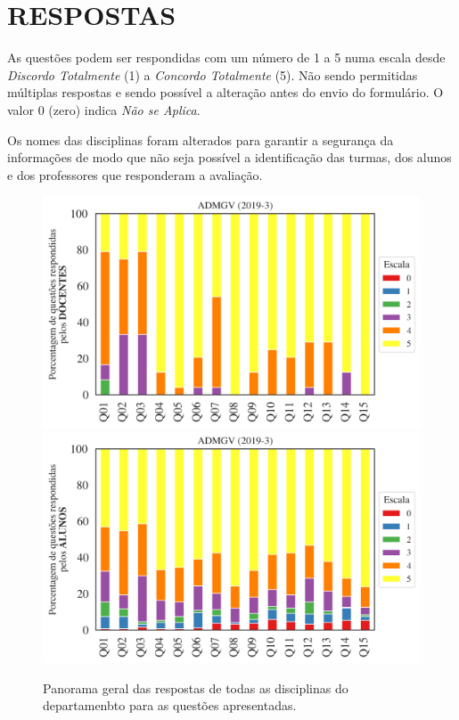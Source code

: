 \documentclass[a4paper,10pt]{article}
\begin{document}
\section{RESPOSTAS}
As questões podem ser respondidas com um número de 1 a 5 numa escala desde {\it Discordo Totalmente} (1) a {\it Concordo Totalmente} (5). Não sendo permitidas múltiplas respostas e sendo possível a alteração antes do envio do formulário. O valor 0 (zero) indica {\it Não se Aplica}.

Os nomes das disciplinas foram alterados para garantir a segurança da informações de modo que não seja possível a identificação das turmas, dos alunos  e dos professores que responderam a avaliação.

\begin{figure}[h]
\centering
\includegraphics[width=0.85\linewidth]{analise_geral_departamento_ADMGV_docentes.png}
\includegraphics[width=0.85\linewidth]{analise_geral_departamento_ADMGV_alunos.png}
\caption{\label{fig:analise_geral_departamento}            Panorama geral das respostas de todas as  disciplinas do departamenbto para as questões apresentadas.}
\end{figure}
\end{document}
